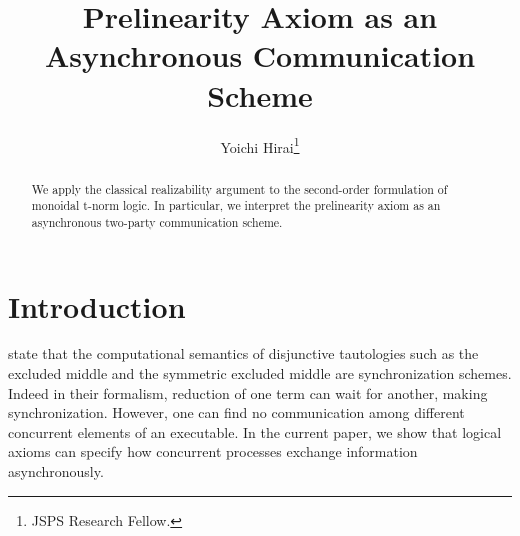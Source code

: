 \documentclass[envcountsame]{llncs}
\title{Prelinearity Axiom as an Asynchronous Communication Scheme}
\author{Yoichi Hirai\thanks{JSPS Research Fellow.}}
\institute{The University of Tokyo \email{yh@is.s.u-tokyo.ac.jp}}
\begin{document}
\maketitle
\begin{abstract}
 We apply the classical realizability argument to the second-order
 formulation of monoidal t-norm logic.
 In particular, we interpret the
 prelinearity axiom as an asynchronous two-party communication scheme.
\end{abstract}


\section{Introduction}
\citet{danos-krivine} state that
the computational semantics of disjunctive tautologies
such as the excluded middle and the symmetric excluded middle
are synchronization schemes.
Indeed in their formalism, reduction of one term can wait
for another, making synchronization.
However,
one can find no communication among different
concurrent elements of an executable.
In the current paper, we show that logical axioms can specify how
concurrent processes exchange information asynchronously.
\end{document}
